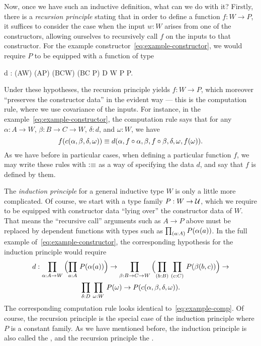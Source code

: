 %
Now, once we have such an inductive definition, what can we do with it?
Firstly, there is a \emph{recursion principle} stating that in order to define a function $f:W\to P$, it suffices to consider the case when the input $w:W$ arises from one of the constructors, allowing ourselves to recursively call $f$ on the inputs to that constructor.
For the example constructor~\eqref{eq:example-constructor}, we would require $P$ to be equipped with a function of type
\begin{narrowmultline}\label{eq:example-rechyp}
  d : (A\to W) \to (A\to P) \to (B\to C\to W) \to 
  \narrowbreak
  (B\to C \to P) \to D \to W \to P \to P.
\end{narrowmultline}
Under these hypotheses, the recursion principle yields $f:W\to P$, which moreover ``preserves the constructor data'' in the evident way --- this is the computation rule, where we use covariance of the inputs.
For instance, in the example~\eqref{eq:example-constructor}, the computation rule says that for any $\alpha:A\to W$, $\beta:B\to C\to W$, $\delta:d$, and $\omega:W$, we have
\begin{equation}
  f(c(\alpha,\beta,\delta,\omega)) \jdeq d(\alpha,f\circ \alpha,\beta, f\circ \beta, \delta, \omega,f(\omega)).\label{eq:example-comp}
\end{equation}
As we have before in particular cases, when defining a particular function $f$, we may write these rules with $\vcentcolon\equiv$ as a way of specifying the data $d$, and say that $f$ is defined by them.

%
The \emph{induction principle} for a general inductive type $W$ is only a little more complicated.
Of course, we start with a type family $P:W\to\mathcal{U}$, which we require to be equipped with constructor data ``lying over'' the constructor data of $W$.
That means the ``recursive call'' arguments such as $A\to P$ above must be replaced by dependent functions with types such as $\prd{a:A} P(\alpha(a))$.
In the full example of~\eqref{eq:example-constructor}, the corresponding hypothesis for the induction principle would require
\begin{multline}\label{eq:example-indhyp}
d : \prd{\alpha:A\to W}\Parens{\prd{a:A} P(\alpha(a))} \to \narrowbreak
\prd{\beta:B\to C\to W} \Parens{\prd{b:B}{c:C} P(\beta(b,c))} \to\\
\prd{\delta:D}
\prd{\omega:W} P(\omega) \to
P(c(\alpha,\beta,\delta,\omega)).
\end{multline}
The corresponding computation rule looks identical to~\eqref{eq:example-comp}.
Of course, the recursion principle is the special case of the induction principle where $P$ is a constant family.
As we have mentioned before, the induction principle is also called the , and the recursion principle the .

